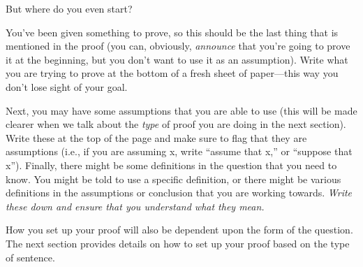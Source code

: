 \documentclass[../../../include/open-logic-section]{subfiles}
\begin{document}


But where do you even start?

You've been given something to prove, so this should be the last thing that
is mentioned in the proof (you can, obviously, \emph{announce} that you're
going to prove it at the beginning, but you don't want to use it as an
assumption). Write what you are trying to prove at the bottom of a fresh
sheet of paper---this way you don't lose sight of your goal.

Next, you may have some assumptions that you are able to use (this will be
made clearer when we talk about the \emph{type} of proof you are doing in
the next section). Write these at the top of the page and make sure to flag
that they are assumptions (i.e., if you are assuming x, write ``assume that
x,'' or ``suppose that x''). Finally, there might be some definitions in
the question that you need to know. You might be told to use a specific
definition, or there might be various definitions in the assumptions or
conclusion that you are working towards. \emph{Write these down and ensure
that you understand what they mean.}

How you set up your proof will also be dependent upon the form of the
question. The next section provides details on how to set up your proof
based on the type of sentence.
\end{document}
